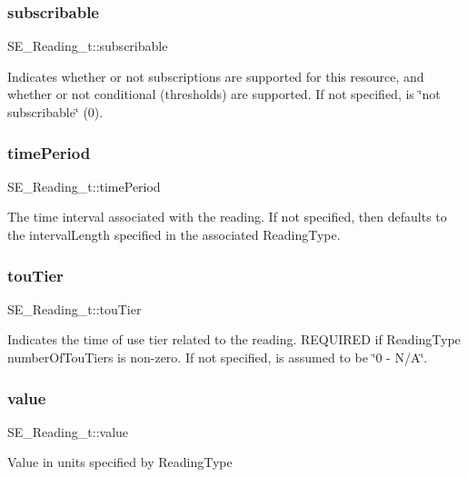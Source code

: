 \subsubsection{\texorpdfstring{subscribable}{subscribable}}
{\footnotesize\ttfamily S\+E\+\_\+\+Reading\+\_\+t\+::subscribable}

Indicates whether or not subscriptions are supported for this resource, and whether or not conditional (thresholds) are supported. If not specified, is \char`\"{}not subscribable\char`\"{} (0). \mbox{\label{group__Reading_gae2c965e36cb3bfd4d5efe6772099ac2c}} 
\subsubsection{\texorpdfstring{time\+Period}{timePeriod}}
{\footnotesize\ttfamily S\+E\+\_\+\+Reading\+\_\+t\+::time\+Period}

The time interval associated with the reading. If not specified, then defaults to the interval\+Length specified in the associated Reading\+Type. \mbox{\label{group__Reading_gaba7139999e2a8cbd77c4caf446c80503}} 
\subsubsection{\texorpdfstring{tou\+Tier}{touTier}}
{\footnotesize\ttfamily S\+E\+\_\+\+Reading\+\_\+t\+::tou\+Tier}

Indicates the time of use tier related to the reading. R\+E\+Q\+U\+I\+R\+ED if Reading\+Type number\+Of\+Tou\+Tiers is non-\/zero. If not specified, is assumed to be \char`\"{}0 -\/ N/\+A\char`\"{}. \mbox{\label{group__Reading_ga298b1b3d2687afb45f8b481db80648de}} 
\subsubsection{\texorpdfstring{value}{value}}
{\footnotesize\ttfamily S\+E\+\_\+\+Reading\+\_\+t\+::value}

Value in units specified by Reading\+Type 